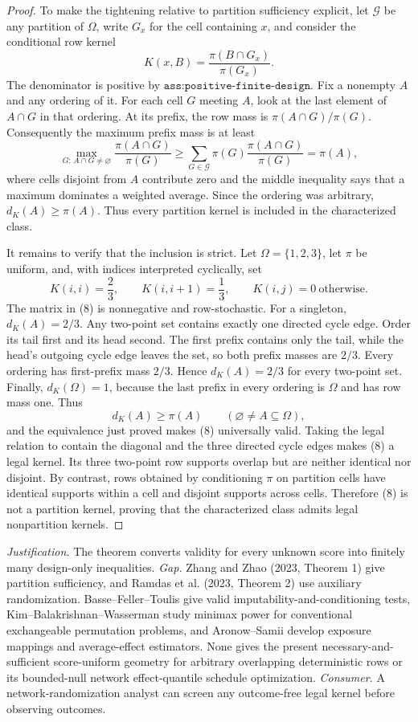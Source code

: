 \documentclass{article}
\begin{document}
\begin{proof}
To make the tightening relative to partition sufficiency explicit, let
\(\mathcal G\) be any partition of \(\Omega\), write \(G_x\) for the cell
containing \(x\), and consider the conditional row kernel
\[
K(x,B)=\frac{\pi(B\cap G_x)}{\pi(G_x)}.
\tag{6}
\]
The denominator is positive by \(\texttt{ass:positive-finite-design}\).  Fix a
nonempty \(A\) and any ordering of it.  For each cell \(G\) meeting \(A\), look
at the last element of \(A\cap G\) in that ordering.  At its prefix, the row
mass is \(\pi(A\cap G)/\pi(G)\).  Consequently the maximum prefix mass is at
least
\[
\max_{G:\,A\cap G\neq\varnothing}
\frac{\pi(A\cap G)}{\pi(G)}
\geq
\sum_{G\in\mathcal G}\pi(G)
\frac{\pi(A\cap G)}{\pi(G)}
=\pi(A),
\tag{7}
\]
where cells disjoint from \(A\) contribute zero and the middle inequality says
that a maximum dominates a weighted average.  Since the ordering was arbitrary,
\(d_K(A)\geq\pi(A)\).  Thus every partition kernel is included in the
characterized class.

It remains to verify that the inclusion is strict.  Let
\(\Omega=\{1,2,3\}\), let \(\pi\) be uniform, and, with indices interpreted
cyclically, set
\[
K(i,i)=\frac23,
\qquad
K(i,i+1)=\frac13,
\qquad
K(i,j)=0\ \text{otherwise}.
\tag{8}
\]
The matrix in (8) is nonnegative and row-stochastic.  For a singleton,
\(d_K(A)=2/3\).  Any two-point set contains exactly one directed cycle edge.
Order its tail first and its head second.  The first prefix contains only the
tail, while the head's outgoing cycle edge leaves the set, so both prefix
masses are \(2/3\).  Every ordering has first-prefix mass \(2/3\).  Hence
\(d_K(A)=2/3\) for every two-point set.  Finally,
\(d_K(\Omega)=1\), because the last prefix in every ordering is \(\Omega\) and
has row mass one.  Thus
\[
d_K(A)\geq\pi(A)
\qquad(\varnothing\neq A\subseteq\Omega),
\]
and the equivalence just proved makes (8) universally valid.  Taking the legal
relation to contain the diagonal and the three directed cycle edges makes (8)
a legal kernel.  Its three two-point row supports overlap but are neither
identical nor disjoint.  By contrast, rows obtained by conditioning \(\pi\) on
partition cells have identical supports within a cell and disjoint supports
across cells.  Therefore (8) is not a partition kernel, proving that the
characterized class admits legal nonpartition kernels.
\end{proof}
\par\smallskip\noindent \textit{Justification.} The theorem converts validity for every unknown score into finitely many design-only inequalities. \textit{Gap.} Zhang and Zhao (2023, Theorem 1) give partition sufficiency, and Ramdas et al. (2023, Theorem 2) use auxiliary randomization. Basse--Feller--Toulis give valid imputability-and-conditioning tests, Kim--Balakrishnan--Wasserman study minimax power for conventional exchangeable permutation problems, and Aronow--Samii develop exposure mappings and average-effect estimators. None gives the present necessary-and-sufficient score-uniform geometry for arbitrary overlapping deterministic rows or its bounded-null network effect-quantile schedule optimization. \textit{Consumer.} A network-randomization analyst can screen any outcome-free legal kernel before observing outcomes.
\end{document}
